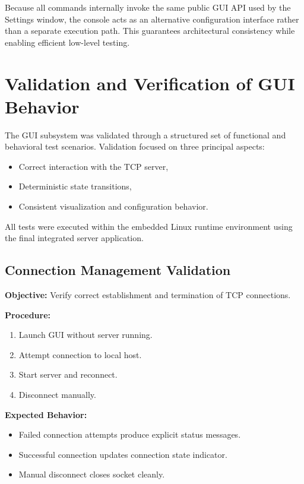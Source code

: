 Because all commands internally invoke the same public GUI API used by the Settings window, the console acts as an alternative configuration interface rather than a separate execution path. This guarantees architectural consistency while enabling efficient low-level testing.

\section{Validation and Verification of GUI Behavior}
\label{sec:gui_validation}

The GUI subsystem was validated through a structured set of functional and behavioral test scenarios. Validation focused on three principal aspects:

\begin{itemize}
	\item Correct interaction with the TCP server,
	\item Deterministic state transitions,
	\item Consistent visualization and configuration behavior.
\end{itemize}

All tests were executed within the embedded Linux runtime environment using the final integrated server application.

\subsection{Connection Management Validation}
\label{sec:gui_validation_connection}

\textbf{Objective:}  
Verify correct establishment and termination of TCP connections.

\textbf{Procedure:}
\begin{enumerate}
	\item Launch GUI without server running.
	\item Attempt connection to local host.
	\item Start server and reconnect.
	\item Disconnect manually.
\end{enumerate}

\textbf{Expected Behavior:}
\begin{itemize}
	\item Failed connection attempts produce explicit status messages.
	\item Successful connection updates connection state indicator.
	\item Manual disconnect closes socket cleanly.
\end{itemize}


